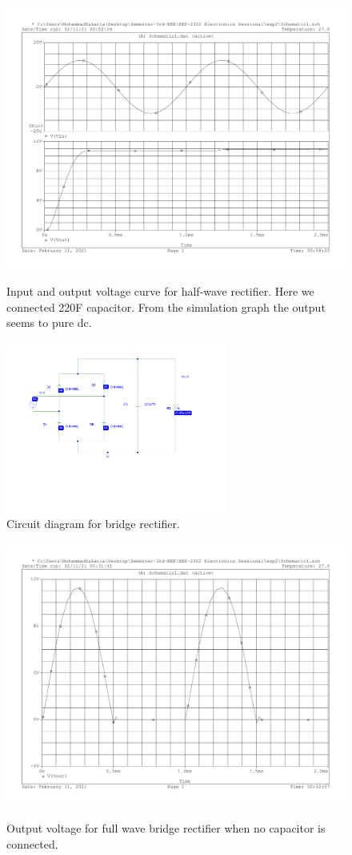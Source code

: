 \documentclass{article}
\begin{document}
	\begin{figure}[!htb]
		\centering
		\includegraphics[width=0.7\linewidth]{Vout-and-Vin-for-halfwavefinal}
		\caption{}
		\label{fig:vout-and-vin-for-halfwavefinal} Input and output voltage curve for half-wave rectifier. Here we connected 220\textmu F capacitor. From the simulation graph the output seems to pure dc.
	\end{figure}


	
	\begin{figure}[!htb]
		\begin{center}
			\includegraphics[width=0.65\textwidth]{ckt-diagram-fullwave.pdf} %
			\caption{Circuit diagram for bridge rectifier.}
		\end{center}
	\end{figure}	


	\begin{figure}[!htb]
		\centering
		\includegraphics[width=0.7\linewidth]{Vout1}
		\caption{}
		\label{fig:vout1} Output voltage for full wave bridge rectifier when no capacitor is connected.
	\end{figure}
	
\end{document}
